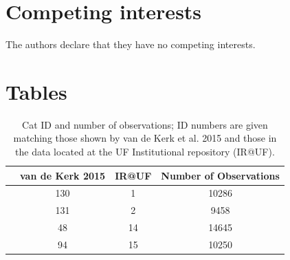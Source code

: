 \documentclass{bmcart}
\begin{document}
\begin{backmatter}
\section*{Competing interests}
The authors declare that they have no competing interests.


\section*{Tables}
\begin{table}[h!]
\caption{Cat ID and number of observations; ID numbers are given matching
those shown by van de Kerk et al. 2015 and those 
in the data located at the UF Institutional repository (IR@UF).}
\begin{tabular}{cccc}
  \hline
  & van de Kerk 2015  & IR@UF   & Number of Observations\\ \hline
  & 130 & 1 & 10286\\
  & 131 & 2  & 9458\\
  & 48 & 14  & 14645\\
  & 94  & 15   & 10250\\ \hline
\end{tabular}
\end{table}
      
\end{backmatter}
\end{document}
